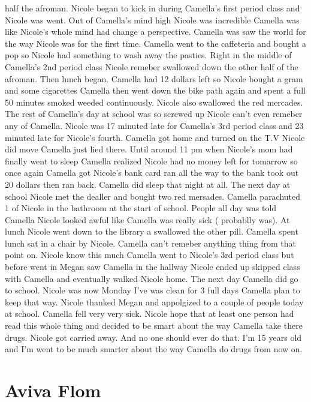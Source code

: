 \documentclass[12pt]{book}
\begin{document}
half the afroman. Nicole began to kick in during Camella's first period class and Nicole was went. Out of Camella's mind high Nicole was incredible Camella was like Nicole's whole mind had change a perspective. Camella was saw the world for the way Nicole was for the first time. Camella went to the caffeteria and bought a pop so Nicole had something to wash away the pasties. Right in the middle of Camella's 2nd period class Nicole remeber swallowed down the other half of the afroman. Then lunch began. Camella had 12 dollars left so Nicole bought a gram and some cigarettes Camella then went down the bike path again and spent a full 50 minutes smoked weeded continuously. Nicole also swallowed the red mercades. The rest of Camella's day at school was so screwed up Nicole can't even remeber any of Camella. Nicole was 17 minuted late for Camella's 3rd period class and 23 minuted late for Nicole's fourth. Camella got home and turned on the T.V Nicole did move Camella just lied there. Until around 11 pm when Nicole's mom had finally went to sleep Camella realized Nicole had no money left for tomarrow so once again Camella got Nicole's bank card ran all the way to the bank took out 20 dollars then ran back. Camella did sleep that night at all. The next day at school Nicole met the dealler and bought two red mersades. Camella parachuted 1 of Nicole in the bathroom at the start of school. People all day was told Camella Nicole looked awful like Camella was really sick ( probablly was). At lunch Nicole went down to the library a swallowed the other pill. Camella spent lunch sat in a chair by Nicole. Camella can't remeber anything thing from that point on. Nicole know this much Camella went to Nicole's 3rd period class but before went in Megan saw Camella in the hallway Nicole ended up skipped class with Camella and eventually walked Nicole home. The next day Camella did go to school. Nicole was now Monday I've was clean for 3 full days Camella plan to keep that way. Nicole thanked Megan and appolgized to a couple of people today at school. Camella fell very very sick. Nicole hope that at least one person had read this whole thing and decided to be smart about the way Camella take there drugs. Nicole got carried away. And no one should ever do that. I'm 15 years old and I'm went to be much smarter about the way Camella do drugs from now on.



\chapter{Aviva Flom}
\end{document}
